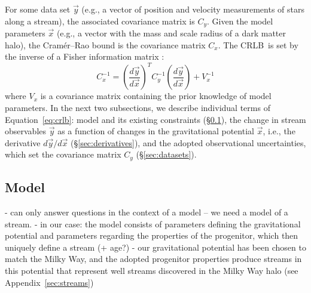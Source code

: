 \documentclass[modern]{aastex61}
\newcommand{\acronym}[1]{{\small{#1}}}
\newcommand{\CRLB}{\acronym{CRLB}}
\begin{document}
For some data set $\vec{y}$ (e.g., a vector of position and velocity measurements of stars along a stream), the associated covariance matrix is $C_y$.
Given the model parameters $\vec{x}$ (e.g., a vector with the mass and scale radius of a dark matter halo), the Cram\' er--Rao bound is the covariance matrix $C_x$.
The \CRLB\ is set by the inverse of a Fisher information matrix \citep{}:
\begin{equation}
C_x^{-1} = \left(\frac{d\vec{y}}{d\vec{x}}\right)^{T} C_y^{-1} \left(\frac{d\vec{y}}{d\vec{x}}\right) + V_x^{-1}
\label{eq:crlb}
\end{equation}
where $V_x$ is a covariance matrix containing the prior knowledge of model parameters.
In the next two subsections, we describe individual terms of Equation~\ref{eq:crlb}: model and its existing constraints (\S\ref{sec:model}), the change in stream observables $\vec{y}$ as a function of changes in the gravitational potential $\vec{x}$, i.e., the derivative $d\vec{y}/d\vec{x}$ (\S\ref{sec:derivatives}), and the adopted observational uncertainties, which set the covariance matrix $C_y$ (\S\ref{sec:datasets}).

\subsection{Model}
\label{sec:model}
- can only answer questions in the context of a model -- we need a model of a stream.
- in our case: the model consists of parameters defining the gravitational potential and parameters regarding the properties of the progenitor, which then uniquely define a stream (+ age?)
- our gravitational potential has been chosen to match the Milky Way, and the adopted progenitor properties produce streams in this potential that represent well streams discovered in the Milky Way halo (see Appendix~\ref{sec:streams})

\end{document}
